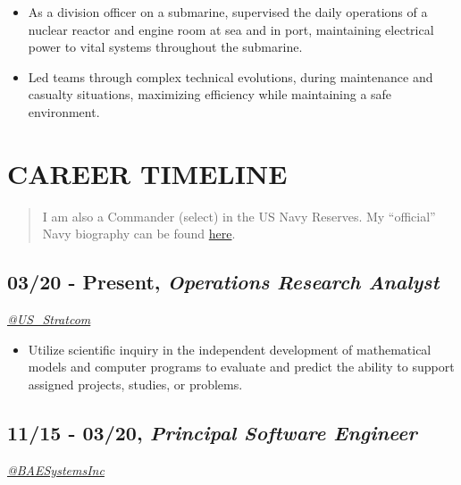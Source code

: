 \documentclass[10pt]{article}
\def\tightlist{}
\begin{document}
\begin{itemize}
\tightlist
\item
  As a division officer on a submarine, supervised the daily operations
  of a nuclear reactor and engine room at sea and in port, maintaining
  electrical power to vital systems throughout the submarine.
\item
  Led teams through complex technical evolutions, during maintenance and
  casualty situations, maximizing efficiency while maintaining a safe
  environment.
\end{itemize}

\hypertarget{career-timeline}{%
\section{CAREER TIMELINE}\label{career-timeline}}

\begin{quote}
I am also a Commander (select) in the US Navy Reserves. My ``official''
Navy biography can be found
\href{https://github.com/jhwohlgemuth/navy-biography}{here}.
\end{quote}

\hypertarget{present-operations-research-analyst}{%
\subsection{\texorpdfstring{03/20 - Present, \textbf{\emph{Operations
Research
Analyst}}}{03/20 - Present, Operations Research Analyst}}\label{present-operations-research-analyst}}

\emph{\href{https://twitter.com/US_Stratcom}{@US\_Stratcom}}

\begin{itemize}
\tightlist
\item
  Utilize scientific inquiry in the independent development of
  mathematical models and computer programs to evaluate and predict the
  ability to support assigned projects, studies, or problems.
\end{itemize}

\hypertarget{principal-software-engineer}{%
\subsection{\texorpdfstring{11/15 - 03/20, \textbf{\emph{Principal
Software
Engineer}}}{11/15 - 03/20, Principal Software Engineer}}\label{principal-software-engineer}}

\emph{\href{https://twitter.com/BAESystemsInc}{@BAESystemsInc}}
\end{document}
